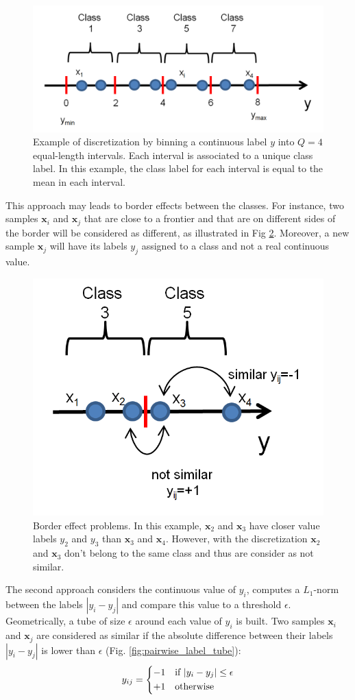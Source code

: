 \begin{figure}[h!]
	\centering
	\includegraphics[width=0.6\linewidth]{images/Discretize_binning}
	\caption{Example of discretization by binning a continuous label $y$ into $Q=4$ equal-length intervals. Each interval is associated to a unique class label. In this example, the class label for each interval is equal to the mean in each interval.}
	\label{fig:Discretize_binning}
\end{figure}

\noindent This approach may leads to border effects between the classes. For instance, two samples $\textbf{x}_i$ and $\textbf{x}_j$ that are close to a frontier and that are on different sides of the border will be considered as different, as illustrated in Fig \ref{fig:Discretize_binning_border_effect}. Moreover, a new sample $\textbf{x}_j$ will have its labels $y_j$ assigned to a class and not a real continuous value. 

\begin{figure}[h!]
	\centering
	\includegraphics[width=0.42\linewidth]{images/Discretize_binning_border_effect}
	\caption{Border effect problems. In this example, $\textbf{x}_2$ and $\textbf{x}_3$ have closer value labels $y_2$ and $y_3$ than $\textbf{x}_3$ and $\textbf{x}_4$. However, with the discretization $\textbf{x}_2$ and $\textbf{x}_3$ don't belong to the same class and thus are consider as not similar.}
	\label{fig:Discretize_binning_border_effect}
\end{figure}

\noindent The second approach considers the continuous value of $y_i$, computes a $L_1$-norm between the labels $|y_i-y_j|$ and compare this value to a threshold $\epsilon$. Geometrically, a tube of size $\epsilon$ around each value of $y_i$ is built. Two samples $\textbf{x}_i$ and  $\textbf{x}_j$ are considered as similar if the absolute difference between their labels $|y_i-y_j|$ is lower than $\epsilon$ (Fig. \ref{fig:pairwise_label_tube}):
\begin{equation}
y_{ij} = 
\left\{
\begin{split}
\begin{aligned}
-1 & \text{\quad if } |y_i-y_j| \leq \epsilon \\ 
+1 & \text{\quad otherwise }
\end{aligned} 
\end{split}
\right.
\end{equation}


